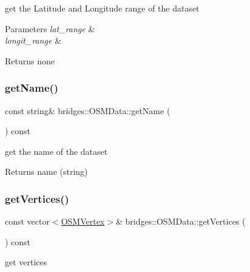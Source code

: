 get the Latitude and Longitude range of the dataset


\begin{DoxyParams}{Parameters}
{\em lat\+\_\+range} & \\
\hline
{\em longit\+\_\+range} & \\
\hline
\end{DoxyParams}
\begin{DoxyReturn}{Returns}
none 
\end{DoxyReturn}
\mbox{\label{classbridges_1_1_o_s_m_data_a420a29bced0d8c04bc5afcb9adf0621a}} 
\subsubsection{\texorpdfstring{get\+Name()}{getName()}}
{\footnotesize\ttfamily const string\& bridges\+::\+O\+S\+M\+Data\+::get\+Name (\begin{DoxyParamCaption}{ }\end{DoxyParamCaption}) const\hspace{0.3cm}{\ttfamily [inline]}}

get the name of the dataset

\begin{DoxyReturn}{Returns}
name (string) 
\end{DoxyReturn}
\mbox{\label{classbridges_1_1_o_s_m_data_a2f8fd5e4d3d0252ae7afae32f9ccc4fa}} 
\subsubsection{\texorpdfstring{get\+Vertices()}{getVertices()}}
{\footnotesize\ttfamily const vector$<$\mbox{\hyperlink{classbridges_1_1_o_s_m_vertex}{O\+S\+M\+Vertex}}$>$\& bridges\+::\+O\+S\+M\+Data\+::get\+Vertices (\begin{DoxyParamCaption}{ }\end{DoxyParamCaption}) const\hspace{0.3cm}{\ttfamily [inline]}}

get vertices

